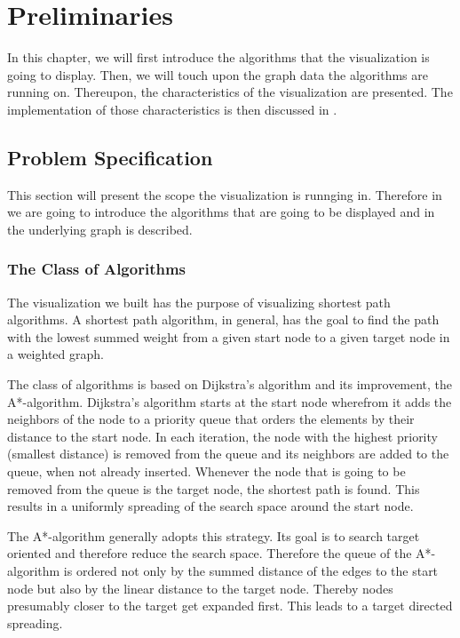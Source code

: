 \documentclass
[
    paper = a4,
    pagesize,
    12 pt,
    oneside,                       %
    open = right,
    DIV = calc,
    BCOR = 0 mm,                   %
    bibtotoc
]
{scrbook}
\begin{document}
\chapter{Preliminaries} \label{questions}

In this chapter, we will first introduce the algorithms that the visualization is going to display.
Then, we will touch upon the graph data the algorithms are running on.
Thereupon, the characteristics of the visualization are presented.
The implementation of those characteristics is then discussed in .


\section{Problem Specification} \label{specification}

This section will present the scope the visualization is runnging in.
Therefore in  we are going to introduce the algorithms that are going to be displayed and in  the underlying graph is described.

\subsection{The Class of Algorithms} \label{framework}

The visualization we built has the purpose of visualizing shortest path algorithms.
A shortest path algorithm, in general, has the goal to find the path with the lowest summed weight from a given start node to a given target node in a weighted graph.

The class of algorithms is based on Dijkstra's algorithm\cite{DIJKSTRA1959} and its improvement, the A*-algorithm\cite{4082128}.
Dijkstra's algorithm starts at the start node wherefrom it adds the neighbors of the node to a priority queue that orders the elements by their distance to the start node.
In each iteration, the node with the highest priority (smallest distance) is removed from the queue and its neighbors are added to the queue, when not already inserted.
Whenever the node that is going to be removed from the queue is the target node, the shortest path is found.
This results in a uniformly spreading of the search space around the start node.

The A*-algorithm generally adopts this strategy.
Its goal is to search target oriented and therefore reduce the search space.
Therefore the queue of the A*-algorithm is ordered not only by the summed distance of the edges to the start node but also by the linear distance to the target node.
Thereby nodes presumably closer to the target get expanded first.
This leads to a target directed spreading.
\end{document}
